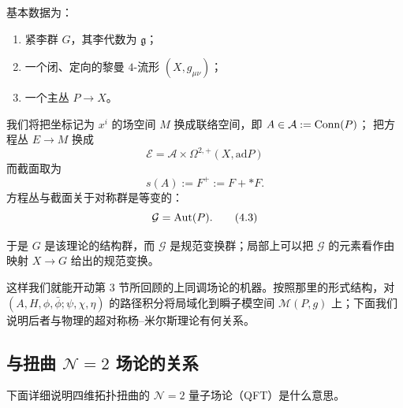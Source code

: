 基本数据为：
\begin{enumerate}[label=\arabic*., leftmargin=2.2em]
  \item 紧李群 $G$，其李代数为 $\mathfrak{g}$；
  \item 一个闭、定向的黎曼 $4$-流形 $(X,g_{\mu\nu})$；
  \item 一个主丛 $P\to X$。
\end{enumerate}

我们将把坐标记为 $x^i$ 的场空间 $M$ 换成联络空间，即 $A\in\mathcal{A}:=\operatorname{Conn}(P)$；
把方程丛 $E\to M$ 换成
\begin{equation}
  \mathcal{E}=\mathcal{A}\times\Omega^{2,+}(X,\mathrm{ad}P)
  \tag{4.1}
\end{equation}
而截面取为
\begin{equation}
  s(A):=F^{+}:=F+\ast F .
  \tag{4.2}
\end{equation}
方程丛与截面关于对称群是等变的：
\begin{equation}
  \mathcal{G}=\operatorname{Aut}(P).
  \tag{4.3}
\end{equation}


于是 $G$ 是该理论的结构群，而 $\mathcal{G}$ 是规范变换群；局部上可以把 $\mathcal{G}$
的元素看作由映射 $X\to G$ 给出的规范变换。

{\sloppy
这样我们就能开动第 3 节所回顾的上同调场论的机器。按照那里的形式结构，对
$(A,H,\phi,\bar\phi;\psi,\chi,\eta)$ 的路径积分将局域化到瞬子模空间
$\mathcal{M}(P,g)$ 上；下面我们说明后者与物理的超对称杨--米尔斯理论有何关系。\par}

\subsection{与扭曲 $\mathcal{N}=2$ 场论的关系}
\label{sec:4-2}

下面详细说明四维拓扑扭曲的 $\mathcal{N}=2$ 量子场论（QFT）是什么意思。

